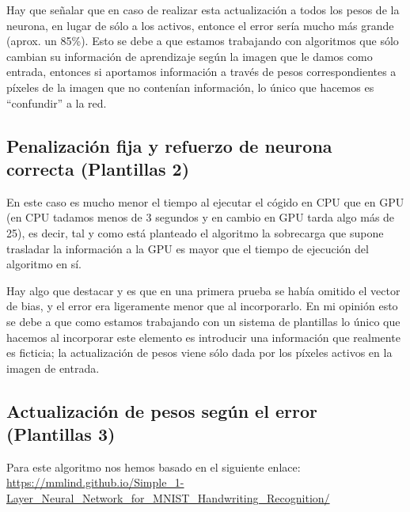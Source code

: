 \documentclass[10pt,a4paper]{article}
\begin{document}
Hay que señalar que en caso de realizar esta actualización a todos los pesos de la neurona, en lugar de sólo a los activos, entonce el error sería mucho más grande (aprox. un 85\%). Esto se debe a que estamos trabajando con algoritmos que sólo cambian su información de aprendizaje según la imagen que le damos como entrada, entonces si aportamos información a través de pesos correspondientes a píxeles de la imagen que no contenían información, lo único que hacemos es ``confundir'' a la red.

\subsection{Penalización fija y refuerzo de neurona correcta (Plantillas 2)}

En este caso es mucho menor el tiempo al ejecutar el cógido en CPU que en GPU (en CPU tadamos menos de 3 segundos y en cambio en GPU tarda algo más de 25), es decir, tal y como está planteado el algoritmo la sobrecarga que supone trasladar la información a la GPU es mayor que el tiempo de ejecución del algoritmo en sí.

Hay algo que destacar y es que en una primera prueba se había omitido el vector de bias, y el error era ligeramente menor que al incorporarlo. En mi opinión esto se debe a que como estamos trabajando con un sistema de plantillas lo único que hacemos al incorporar este elemento es introducir una información que realmente es ficticia; la actualización de pesos viene sólo dada por los píxeles activos en la imagen de entrada.

\subsection{Actualización de pesos según el error (Plantillas 3)}

Para este algoritmo nos hemos basado en el siguiente enlace: \url{https://mmlind.github.io/Simple_1-Layer_Neural_Network_for_MNIST_Handwriting_Recognition/}
\end{document}
